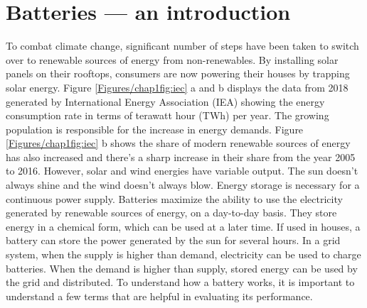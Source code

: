 \chapter{Batteries --- an introduction} %
 \label{chap1} %
\newcommand{\keyword}[1]{\textbf{#1}}
\newcommand{\tabhead}[1]{\textbf{#1}}
\newcommand{\code}[1]{\texttt{#1}}
\newcommand{\file}[1]{\texttt{\bfseries#1}}
\newcommand{\option}[1]{\texttt{\itshape#1}}

To combat climate change, significant number of steps have been taken to switch over to renewable sources of energy from non-renewables. By installing solar panels on their rooftops, consumers are now powering their houses by trapping solar energy. Figure \ref{Figures/chap1fig:iec} a and b displays the data from 2018 generated by International Energy Association (IEA) showing the energy consumption rate in terms of terawatt hour (TWh) per year. The growing population is responsible for the increase in energy demands. Figure \ref{Figures/chap1fig:iec} b shows the share of modern renewable sources of energy has also increased and there's a sharp increase in their share from the year 2005 to 2016. However, solar and wind energies have variable output. The sun doesn't always shine and the wind doesn't always blow. Energy storage is necessary for a continuous power supply. Batteries maximize the ability to use the electricity generated by renewable sources of energy, on a day-to-day basis. They store energy in a chemical form, which can be used at a later time. If used in houses, a battery can store the power generated by the sun for several hours. In a grid system, when the supply is higher than demand, electricity can be used to charge batteries. When the demand is higher than supply, stored energy can be used by the grid and distributed. To understand how a battery works, it is important to understand a few terms that are helpful in evaluating its performance.  

